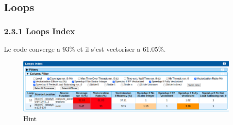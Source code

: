 \documentclass[11pt,a4paper,onecolumn,openright,oneside]{report}
\begin{document}
\subsection{Loops}
\subsubsection{2.3.1 Loops Index}
Le code converge a 93\% et il s'est vectoriser a 61.05\%.
\begin{figure}[H]
    \centering
    \includegraphics[scale=0.38]{Images/2/2-5.1.png}
    \caption{Hint}
    \label{fig:my_label}
\end{figure}
\end{document}

